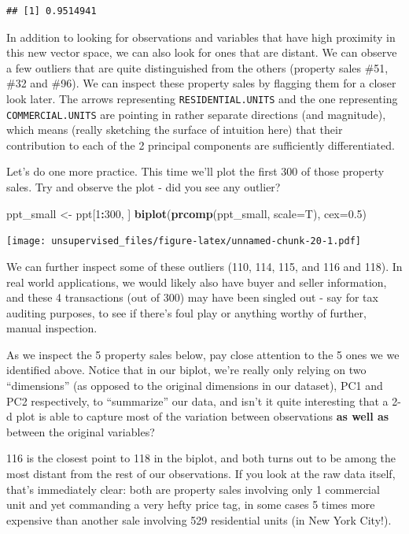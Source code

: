 \documentclass[]{article}
\newenvironment{Shaded}{\begin{snugshade}}{\end{snugshade}}
\newcommand{\DataTypeTok}[1]{\textcolor[rgb]{0.13,0.29,0.53}{#1}}
\newcommand{\DecValTok}[1]{\textcolor[rgb]{0.00,0.00,0.81}{#1}}
\newcommand{\FloatTok}[1]{\textcolor[rgb]{0.00,0.00,0.81}{#1}}
\newcommand{\KeywordTok}[1]{\textcolor[rgb]{0.13,0.29,0.53}{\textbf{#1}}}
\newcommand{\NormalTok}[1]{#1}
\newcommand{\OperatorTok}[1]{\textcolor[rgb]{0.81,0.36,0.00}{\textbf{#1}}}
\newcommand{\StringTok}[1]{\textcolor[rgb]{0.31,0.60,0.02}{#1}}
\begin{document}
\begin{verbatim}
## [1] 0.9514941
\end{verbatim}

In addition to looking for observations and variables that have high
proximity in this new vector space, we can also look for ones that are
distant. We can observe a few outliers that are quite distinguished from
the others (property sales \#51, \#32 and \#96). We can inspect these
property sales by flagging them for a closer look later. The arrows
representing \texttt{RESIDENTIAL.UNITS} and the one representing
\texttt{COMMERCIAL.UNITS} are pointing in rather separate directions
(and magnitude), which means (really sketching the surface of intuition
here) that their contribution to each of the 2 principal components are
sufficiently differentiated.

Let's do one more practice. This time we'll plot the first 300 of those
property sales. Try and observe the plot - did you see any outlier?

\begin{Shaded}
\begin{Highlighting}[]
\NormalTok{ppt_small <-}\StringTok{ }\NormalTok{ppt[}\DecValTok{1}\OperatorTok{:}\DecValTok{300}\NormalTok{, ]}
\KeywordTok{biplot}\NormalTok{(}\KeywordTok{prcomp}\NormalTok{(ppt_small, }\DataTypeTok{scale=}\NormalTok{T), }\DataTypeTok{cex=}\FloatTok{0.5}\NormalTok{)}
\end{Highlighting}
\end{Shaded}

\texttt{[image: unsupervised\_files/figure-latex/unnamed-chunk-20-1.pdf]}

We can further inspect some of these outliers (110, 114, 115, and 116
and 118). In real world applications, we would likely also have buyer
and seller information, and these 4 transactions (out of 300) may have
been singled out - say for tax auditing purposes, to see if there's foul
play or anything worthy of further, manual inspection.

As we inspect the 5 property sales below, pay close attention to the 5
ones we we identified above. Notice that in our biplot, we're really
only relying on two ``dimensions'' (as opposed to the original
dimensions in our dataset), PC1 and PC2 respectively, to ``summarize''
our data, and isn't it quite interesting that a 2-d plot is able to
capture most of the variation between observations \textbf{as well as}
between the original variables?

116 is the closest point to 118 in the biplot, and both turns out to be
among the most distant from the rest of our observations. If you look at
the raw data itself, that's immediately clear: both are property sales
involving only 1 commercial unit and yet commanding a very hefty price
tag, in some cases 5 times more expensive than another sale involving
529 residential units (in New York City!).
\end{document}
